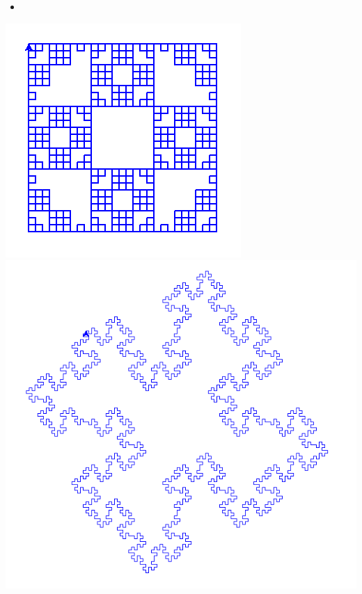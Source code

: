\documentclass[11pt,class=report,crop=false]{standalone}
\begin{document}
\begin{activite}
\begin{enumerate}
\begin{itemize}
	  \item {}              
	\end{itemize}
	
\medskip	
	
\begin{center}
\includegraphics[scale=\myscale,scale=0.3]{screen-lsystems-4}\quad
\includegraphics[scale=\myscale,scale=0.2]{screen-lsystems-5}\quad

\end{center}
\end{enumerate}
\end{activite}
\end{document}
